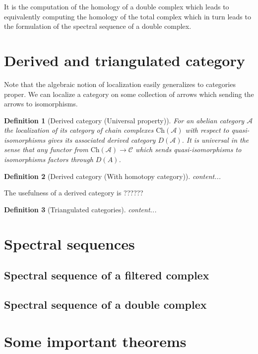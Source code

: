 \documentclass[12pt]{article}
\numberwithin{equation}{section}
\newtheorem{definition}{Definition}[section]
\begin{document}
	It is the computation of the homology of a double complex which leads to equivalently computing the homology of the total complex which in turn leads to the formulation of the spectral sequence of a double complex.
	
	\section{Derived and triangulated category}
	
	Note that the algebraic notion of localization easily generalizes to categories proper. We can localize a category on some collection of arrows which sending the arrows to isomorphisms.
	
	\begin{definition}[Derived category (Universal property)]
		For an abelian category $\mathcal{A}$ the localization of its category of chain complexes $\mathrm{Ch}(\mathcal{A})$ with respect to quasi-isomorphisms gives its associated derived category $D(\mathcal{A})$. It is universal in the sense that any functor from $\mathrm{Ch}(\mathcal{A}) \to \mathcal{C}$ which sends quasi-isomorphisms to isomorphisms factors through $D(A)$.
	\end{definition}
	
	\begin{definition}[Derived category (With homotopy category)]
		content...
	\end{definition}
	
	The usefulness of a derived category is ??????
	
	\begin{definition}[Triangulated categories]
		content...
	\end{definition}
	
	\section{Spectral sequences}
	\subsection{Spectral sequence of a filtered complex}
	
	\subsection{Spectral sequence of a double complex}
	
	
	\section{Some important theorems}
\end{document}
